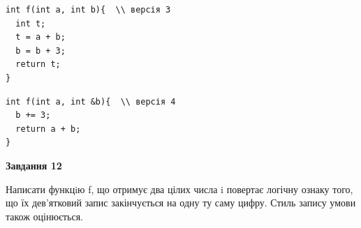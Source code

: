 \documentclass[12pt, ukrainian]{article}
\begin{document}
{\begin {large}
\begin{minipage}[t]{11.0cm}
\vspace{-8mm}\begin{verbatim}
int f(int a, int b){  \\ версія 3
  int t;
  t = a + b;
  b = b + 3;
  return t;
}
\end{verbatim}

\vspace{-8mm}\begin{verbatim}
int f(int a, int &b){  \\ версія 4
  b += 3;
  return a + b;
}
\end{verbatim}



\begin{center}
\textbf{Завдання 12}
\end{center}

Написати функцiю f, що отримує два цілих числа i повертає логічну ознаку того, що їх дев'ятковий запис закінчується на одну ту саму цифру. Стиль запису умови також оцінюється.\par

\end{minipage}

\end {large}}
\newpage
\end{document}
